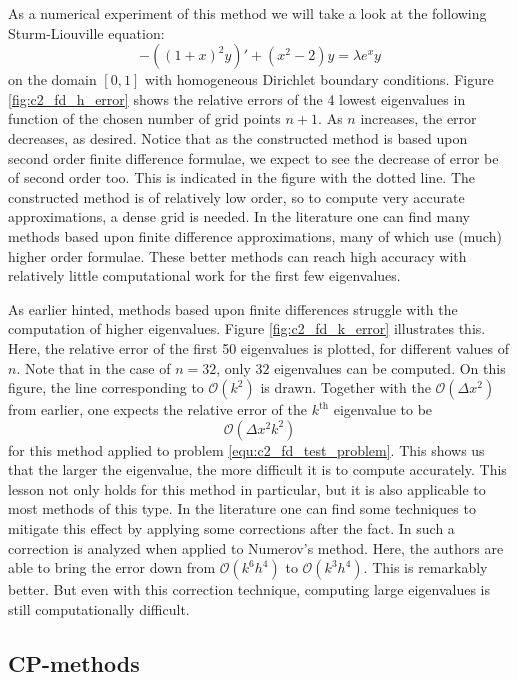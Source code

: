 As a numerical experiment of this method we will take a look at the following Sturm-Liouville equation:
\begin{equation}\label{equ:c2_fd_test_problem}
    -\left((1+x)^2 y \right)' + (x^2 - 2) y = \lambda e^x y
\end{equation}
on the domain $[0, 1]$ with homogeneous Dirichlet boundary conditions. Figure \ref{fig:c2_fd_h_error} shows the relative errors of the 4 lowest eigenvalues in function of the chosen number of grid points $n+1$. As $n$ increases, the error decreases, as desired. Notice that as the constructed method is based upon second order finite difference formulae, we expect to see the decrease of error be of second order too. This is indicated in the figure with the dotted line. The constructed method is of relatively low order, so to compute very accurate approximations, a dense grid is needed. In the literature one can find many methods based upon finite difference approximations, many of which use (much) higher order formulae. These better methods can reach high accuracy with relatively little computational work for the first few eigenvalues.

As earlier hinted, methods based upon finite differences struggle with the computation of higher eigenvalues. Figure \ref{fig:c2_fd_k_error} illustrates this. Here, the relative error of the first 50 eigenvalues is plotted, for different values of $n$. Note that in the case of $n = 32$, only $32$ eigenvalues can be computed. On this figure, the line corresponding to $\mathcal{O}(k^2)$ is drawn. Together with the $\mathcal{O}(\Delta x^2)$ from earlier, one expects the relative error of the $k^\text{th}$ eigenvalue to be
$$
    \mathcal{O}(\Delta x^2 k^2)
$$
for this method applied to problem \eqref{equ:c2_fd_test_problem}. This shows us that the larger the eigenvalue, the more difficult it is to compute accurately. This lesson not only holds for this method in particular, but it is also applicable to most methods of this type. In the literature one can find some techniques to mitigate this effect by applying some corrections after the fact. In \cite{andrew_correction_1985} such a correction is analyzed when applied to Numerov's method. Here, the authors are able to bring the error down from $\mathcal{O}(k^6 h^4)$ to $\mathcal{O}(k^3 h^4)$. This is remarkably better. But even with this correction technique, computing large eigenvalues is still computationally difficult.

\subsection{CP-methods}

